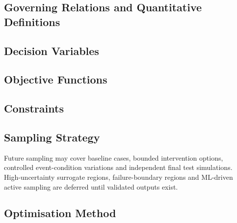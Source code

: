 \subsection{Governing Relations and Quantitative Definitions}
\label{sec:res-opt-doe-governing-relations}

%

\subsection{Decision Variables}
\label{sec:res-opt-doe-decision-variables}


\subsection{Objective Functions}
\label{sec:res-opt-doe-objective-functions}


\subsection{Constraints}
\label{sec:res-opt-doe-constraints}


\subsection{Sampling Strategy}
\label{sec:res-opt-doe-sampling-strategy}

Future sampling may cover baseline cases, bounded intervention
options, controlled event-condition variations and independent final
test simulations. High-uncertainty surrogate regions, failure-boundary
regions and ML-driven active sampling are deferred until validated
outputs exist.

\subsection{Optimisation Method}
\label{sec:res-opt-doe-optimisation-method}

